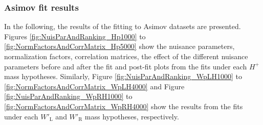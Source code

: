 \subsubsection{Asimov fit results}
\label{subsubsec:AsimovFit}
In the following, the results of the fitting to Asimov datasets are presented. Figures \ref{fig:NuisParAndRanking_Hp1000} to \ref{fig:NormFactorsAndCorrMatrix_Hp5000} show the nuisance parameters, normalization factors, correlation matrices, the effect of the different nuisance parameters before and after the fit and post-fit plots from the fits under each $H^{+}$ mass hypotheses. Similarly, Figure \ref{fig:NuisParAndRanking_WpLH1000} to \ref{fig:NormFactorsAndCorrMatrix_WpLH4000} and Figure \ref{fig:NuisParAndRanking_WpRH1000} to \ref{fig:NormFactorsAndCorrMatrix_WpRH4000} show the results from the fits under each $W'_{\text{L}}$ and $W'_{\text{R}}$ mass hypotheses, respectively.

